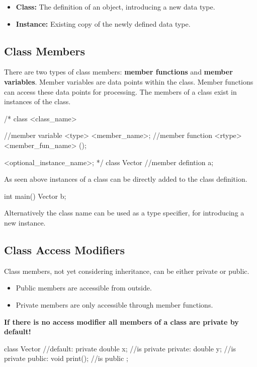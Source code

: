 \documentclass[10pt,a4paper]{scrartcl}
\begin{document}
\begin{multicols*}{2}
\begin{itemize}
\item \textbf{Class:} The definition of an object, introducing a new data type.
\item \textbf{Instance:} Existing copy of the newly defined data type.
\end{itemize}

\subsection{Class Members}

There are two types of class members: \textbf{member functions} and \textbf{member variables}. Member variables are data points within the class. Member functions can access these data points for processing. The members of a class exist in instances of the class.

\begin{TPCpp}
/*
class <class_name> {
	//member variable
	<type> <member_name>;
	//member function
	<rtype> <member_fun_name> ();
	
}<optional_instance_name>;
*/
class Vector {
	//member defintion
}a;
\end{TPCpp}

As seen above instances of a class can be directly added to the class definition.

\begin{TPCpp}
int main(){
	Vector b;
}
\end{TPCpp}

Alternatively the class name can be used as a type specifier, for introducing a new instance.

\subsection{Class Access Modifiers}

Class members, not yet considering inheritance, can be either private or public.

\begin{itemize}
\item Public members are accessible from outside.
\item Private members are only accessible through member functions.
\end{itemize}

\textbf{If there is no access modifier all members of a class are private by default!}

\begin{TPCpp}
class Vector {
	//default: private
	double x; //is private
private: 
	double y; //is private
public:
	void print(); //is public
};
\end{TPCpp}


\end{multicols*}
\end{document}
